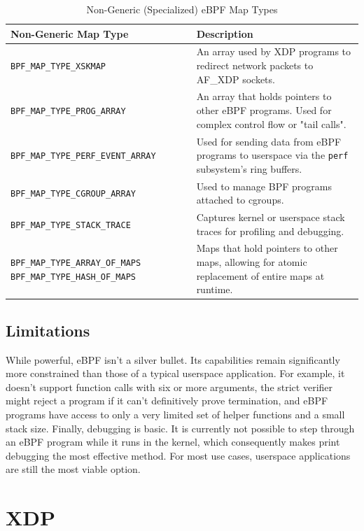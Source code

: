 \begin{table}[h]
    \centering
    \begin{tabular}{p{6cm} p{8cm}}
        \toprule
        Non-Generic Map Type & Description \\
        \midrule
        \texttt{BPF\_MAP\_TYPE\_XSKMAP} & An array used by XDP programs to redirect network packets to AF\_XDP sockets. \\
        \texttt{BPF\_MAP\_TYPE\_PROG\_ARRAY} & An array that holds pointers to other eBPF programs. Used for complex control flow or "tail calls". \\
        \texttt{BPF\_MAP\_TYPE\_PERF\_EVENT\_ARRAY} & Used for sending data from eBPF programs to userspace via the \texttt{perf} subsystem's ring buffers. \\
        \texttt{BPF\_MAP\_TYPE\_CGROUP\_ARRAY} & Used to manage BPF programs attached to cgroups. \\
        \texttt{BPF\_MAP\_TYPE\_STACK\_TRACE} & Captures kernel or userspace stack traces for profiling and debugging. \\
        \texttt{BPF\_MAP\_TYPE\_ARRAY\_OF\_MAPS} \newline \texttt{BPF\_MAP\_TYPE\_HASH\_OF\_MAPS} & Maps that hold pointers to other maps, allowing for atomic replacement of entire maps at runtime. \\
        \bottomrule
    \end{tabular}
    \caption{Non-Generic (Specialized) eBPF Map Types}
    \label{tab:non_generic_ebpf_maps}
\end{table}

\subsection{Limitations}
While powerful, \ac{eBPF} isn't a silver bullet. Its capabilities remain significantly more constrained than those of a typical userspace application. For example, it doesn't support function calls with six or more arguments, the strict verifier might reject a program if it can't definitively prove termination, and \ac{eBPF} programs have access to only a very limited set of helper functions and a small stack size. Finally, debugging is basic. It is currently not possible to step through an \ac{eBPF} program while it runs in the kernel, which consequently makes print debugging the most effective method. For most use cases, userspace applications are still the most viable option.

\section{XDP}
\label{sec:xdp}

